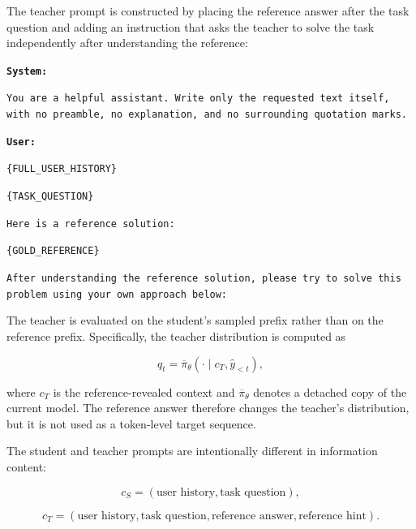 \documentclass{article} %
\begin{document}
The teacher prompt is constructed by placing the reference answer after the task question and adding an instruction that asks the teacher to solve the task independently after understanding the reference:

\begin{tcolorbox}[
    colback=gray!5,
    colframe=black!45,
    title=MIRROR teacher prompt,
    breakable,
    left=3pt,
    right=3pt,
    top=3pt,
    bottom=3pt
]
\small
\texttt{\textbf{System:}}

\texttt{You are a helpful assistant. Write only the requested text itself, with no preamble, no explanation, and no surrounding quotation marks.}

\medskip

\texttt{\textbf{User:}}

\texttt{\{FULL\_USER\_HISTORY\}}

\texttt{\{TASK\_QUESTION\}}

\texttt{Here is a reference solution:}

\texttt{\{GOLD\_REFERENCE\}}

\texttt{After understanding the reference solution, please try to solve this problem using your own approach below:}
\end{tcolorbox}

The teacher is evaluated on the student's sampled prefix rather than on the reference prefix. Specifically, the teacher distribution is computed as

\begin{equation}
q_t
=
\overline{\pi}_{\theta}
\left(
\cdot \mid
c_T,\hat{y}_{<t}
\right),
\end{equation}

where $c_T$ is the reference-revealed context and $\overline{\pi}_{\theta}$ denotes a detached copy of the current model. The reference answer therefore changes the teacher's distribution, but it is not used as a token-level target sequence.

The student and teacher prompts are intentionally different in information content:

\begin{equation}
c_S
=
(\text{user history},\text{task question}),
\end{equation}

\begin{equation}
c_T
=
(\text{user history},\text{task question},
\text{reference answer},\text{reference hint}).
\end{equation}
\end{document}
